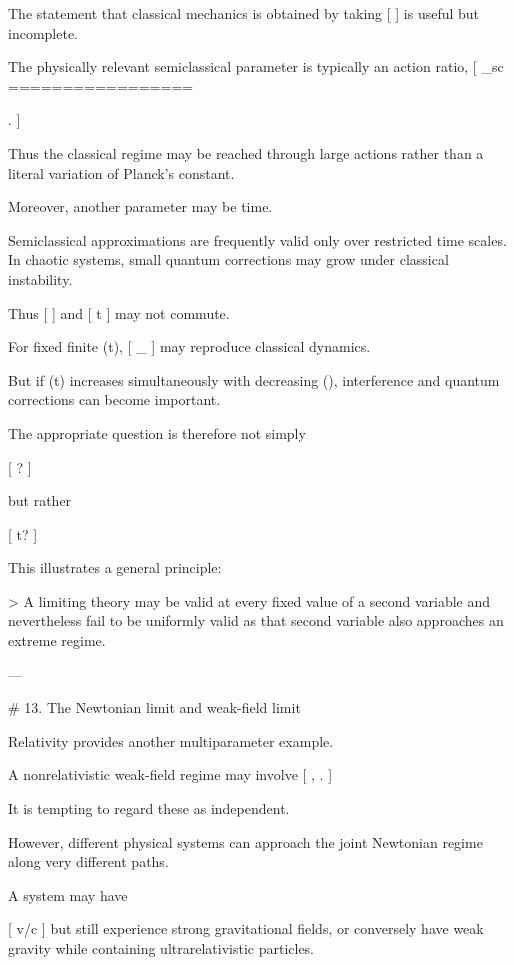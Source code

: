 The statement that classical mechanics is obtained by taking
[
\hbar{}
]
is useful but incomplete.

The physically relevant semiclassical parameter is typically an action ratio,
[
\epsilon_{\rm sc}
=================

.
]

Thus the classical regime may be reached through large actions rather than a literal variation of Planck's constant.

Moreover, another parameter may be time.

Semiclassical approximations are frequently valid only over restricted time scales. In chaotic systems, small quantum corrections may grow under classical instability.

Thus
[
\hbar{}
]
and
[
t\rightarrow\infty
]
may not commute.

For fixed finite (t),
[
\lim_{\hbar{}}
]
may reproduce classical dynamics.

But if (t) increases simultaneously with decreasing (\hbar), interference and quantum corrections can become important.

The appropriate question is therefore not simply

[
\hbar{}?
]

but rather

[
\quad{}t?
]

This illustrates a general principle:

> A limiting theory may be valid at every fixed value of a second variable and nevertheless fail to be uniformly valid as that second variable also approaches an extreme regime.

---

# 13. The Newtonian limit and weak-field limit

Relativity provides another multiparameter example.

A nonrelativistic weak-field regime may involve
[
,
\qquad
{}.
]

It is tempting to regard these as independent.

However, different physical systems can approach the joint Newtonian regime along very different paths.

A system may have

[
v/c
]
but still experience strong gravitational fields, or conversely have weak gravity while containing ultrarelativistic particles.

